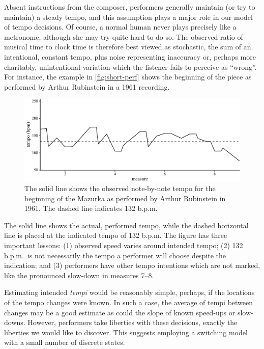 \documentclass[aoas]{imsart}
\begin{document}
Absent instructions from the composer, performers generally maintain
(or try to maintain) a steady tempo, and this assumption plays a major
role in our model of tempo decisions. Of course, a normal human 
never plays precisely like a 
metronome, although she may try quite hard to do so. The observed
ratio of musical time to clock time
is therefore best viewed as stochastic, the sum of an
intentional, constant tempo, plus noise representing inaccuracy
or, perhaps more charitably, unintentional variation which the
listener fails to perceive as ``wrong''. For instance, the example in
\autoref{fig:short-perf} shows the beginning of the piece as performed
by Arthur Rubinstein in a 1961 recording. 
\begin{figure}[t!]
 \centering
 \includegraphics[width=.9\linewidth]{small-rubinstein-1961-1}
 \caption{The solid line shows the observed note-by-note tempo for
   the beginning of the Mazurka as performed by Arthur Rubinstein in
   1961. The dashed line indicates 132 b.p.m.}
 \label{fig:short-perf}
\end{figure}
The solid line shows the
actual, performed tempo, while the dashed horizontal line is placed at
the indicated tempo of 132 b.p.m. The figure has three important
lessons: (1) observed speed varies around intended tempo; (2) 132 b.p.m.\ is
not necessarily the tempo a performer will choose despite the
indication; and (3) performers have other tempo intentions which are
not marked, like the pronounced slow-down in measures 7--8.

Estimating intended {\em tempi} would be reasonably simple, perhaps, 
if the locations of the tempo changes were known. In such a case,
the average of tempi between changes may be a good estimate as
could the slope of known speed-ups or slow-downs. However, performers
take liberties with these decisions, exactly the liberties we would
like to discover. This suggests employing a switching model with a
small number of discrete states.
\end{document}

